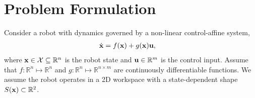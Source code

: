 \section{Problem Formulation}\label{sec:problem}



Consider a robot with dynamics governed by a non-linear control-affine system,
%
\begin{equation}
\label{eq: dynamic}
\begin{aligned}
    &\dot{\mathbf{x}} = f(\mathbf{x}) + g(\mathbf{x}) \mathbf{u} ,
\end{aligned}
\end{equation}
%
where $\mathbf{x} \in {\cal X} \subseteq \mathbb{R}^{n}$ is the robot state and $\mathbf{u} \in  \mathbb{R}^{m}$ is the control input. Assume that $f : \mathbb{R}^{n} \mapsto \mathbb{R}^{n}$ and $g : \mathbb{R}^{n} \mapsto \mathbb{R}^{n \times m}$ are continuously differentiable functions. We assume the robot operates in a 2D workspace with a state-dependent shape $S(\mathbf{x}) \subset \mathbb{R}^2$. 


